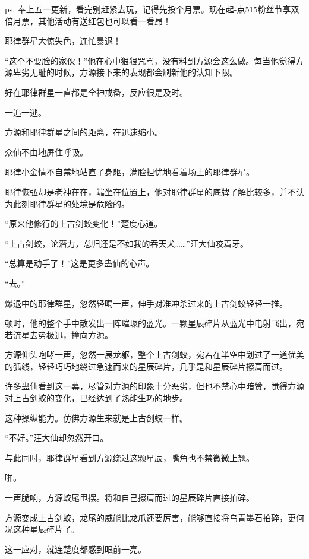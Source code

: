 
\begin{this_body}

ps. 奉上五一更新，看完别赶紧去玩，记得先投个月票。现在起-点515粉丝节享双倍月票，其他活动有送红包也可以看一看昂！

耶律群星大惊失色，连忙暴退！

“这个不要脸的家伙！”他在心中狠狠咒骂，没有料到方源会这么做。每当他觉得方源卑劣无耻的时候，方源接下来的表现都会刷新他的认知下限。

好在耶律群星一直都是全神戒备，反应很是及时。

一追一逃。

方源和耶律群星之间的距离，在迅速缩小。

众仙不由地屏住呼吸。

耶律小金情不自禁地站直了身躯，满脸担忧地看着场上的耶律群星。

耶律恢弘却是老神在在，端坐在位置上，他对耶律群星的底牌了解比较多，并不认为此刻耶律群星的处境是危险的。

“原来他修行的上古剑蛟变化！”楚度心道。

“上古剑蛟，论潜力，总归还是不如我的吞天犬……”汪大仙咬着牙。

“总算是动手了！”这是更多蛊仙的心声。

“去。”

爆退中的耶律群星，忽然轻喝一声，伸手对准冲杀过来的上古剑蛟轻轻一推。

顿时，他的整个手中散发出一阵璀璨的蓝光。一颗星辰碎片从蓝光中电射飞出，宛若流星去势极迅，撞向方源。

方源仰头咆哮一声，忽然一展龙躯，整个上古剑蛟，宛若在半空中划过了一道优美的弧线，轻轻巧巧地绕过急速而来的星辰碎片，几乎是和星辰碎片擦肩而过。

许多蛊仙看到这一幕，尽管对方源的印象十分恶劣，但也不禁心中暗赞，觉得方源对上古剑蛟的变化，已经达到了熟能生巧的地步。

这种操纵能力。仿佛方源生来就是上古剑蛟一样。

“不好。”汪大仙却忽然开口。

与此同时，耶律群星看到方源绕过这颗星辰，嘴角也不禁微微上翘。

啪。

一声脆响，方源蛟尾甩摆。将和自己擦肩而过的星辰碎片直接拍碎。

方源变成上古剑蛟，龙尾的威能比龙爪还要厉害，能够直接将乌青墨石拍碎，更何况这种星辰碎片了。

这一应对，就连楚度都感到眼前一亮。


\end{this_body}

